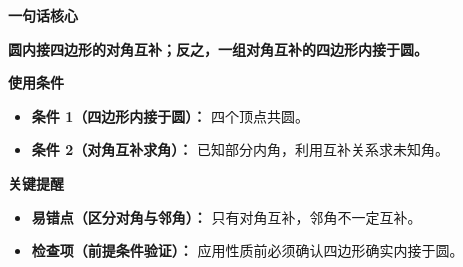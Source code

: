 \begin{summarybox}
	\textbf{\textcolor{CSummary}{一句话核心}}

	\textbf{圆内接四边形的对角互补；反之，一组对角互补的四边形内接于圆。}

	\medskip
	\textbf{\textcolor{CSummary}{使用条件}}
	\begin{itemize}[leftmargin=*, itemsep=0.5em, topsep=0.4em]
		\item \textbf{条件 1（四边形内接于圆）：} 四个顶点共圆。
		\item \textbf{条件 2（对角互补求角）：} 已知部分内角，利用互补关系求未知角。
	\end{itemize}

	\medskip
	\textbf{\textcolor{CSummary}{关键提醒}}
	\begin{itemize}[leftmargin=*, itemsep=0.5em, topsep=0.4em]
		\item \textbf{易错点（区分对角与邻角）：} 只有对角互补，邻角不一定互补。
		\item \textbf{检查项（前提条件验证）：} 应用性质前必须确认四边形确实内接于圆。
	\end{itemize}
\end{summarybox}
